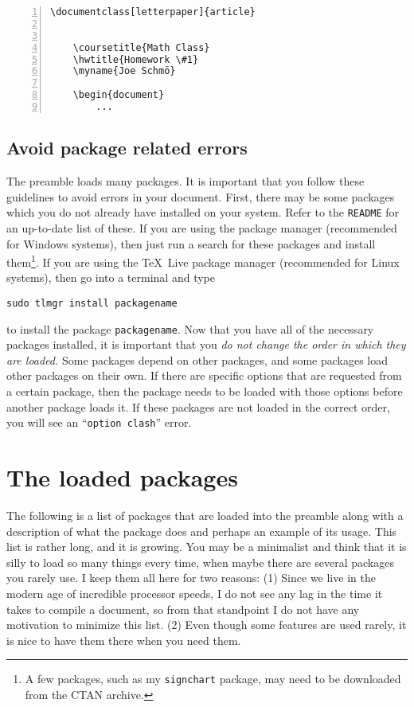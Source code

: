\documentclass[letterpaper,12pt]{article}
\begin{document}
	\begin{Verbatim}[frame=single,gobble=1,fontsize=\small,numbers=left]
	\documentclass[letterpaper]{article}
	
	
	\coursetitle{Math Class}
	\hwtitle{Homework \#1}
	\myname{Joe Schmö}
	
	\begin{document}
	    ...
	\end{Verbatim}
	
	\subsection{Avoid package related errors}
	The preamble loads many packages. It is important that you follow these guidelines to avoid errors in your document. First, there may be some packages which you do not already have installed on your system. Refer to the \texttt{README} for an up-to-date list of these. If you are using the  package manager (recommended for Windows systems), then just run a search for these packages and install them\footnote{A few packages, such as my \texttt{signchart} package, may need to be downloaded from the CTAN archive.}. If you are using the \TeX\ Live package manager (recommended for Linux systems), then go into a terminal and type
	
	\begin{Verbatim}[gobble=1,fontsize=\small]
	sudo tlmgr install packagename
	\end{Verbatim}
	
	to install the package \texttt{packagename}. Now that you have all of the necessary packages installed, it is important that you \emph{do not change the order in which they are loaded.} Some packages depend on other packages, and some packages load other packages on their own. If there are specific options that are requested from a certain package, then the package needs to be loaded with those options before another package loads it. If these packages are not loaded in the correct order, you will see an ``\texttt{option clash}'' error.
	
\section{The loaded packages}
The following is a list of packages that are loaded into the preamble along with a description of what the package does and perhaps an example of its usage. This list is rather long, and it is growing. You may be a minimalist and think that it is silly to load so many things every time, when maybe there are several packages you rarely use. I keep them all here for two reasons: (1) Since we live in the modern age of incredible processor speeds, I do not see any lag in the time it takes to compile a document, so from that standpoint I do not have any motivation to minimize this list. (2) Even though some features are used rarely, it is nice to have them there when you need them.
\end{document}
